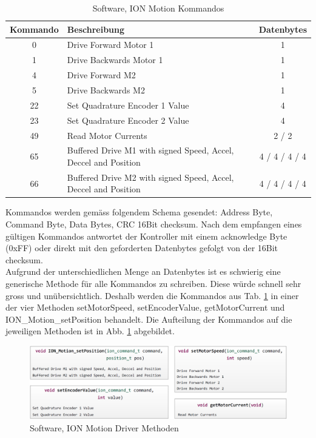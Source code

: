 \begin{table}[H]
	\footnotesize
	\centering
	\caption{Software, ION Motion Kommandos}
	\begin{tabular}{|c|l|c|}
		\hline
		\multicolumn{1}{|l|}{\textcolor[rgb]{ .247,  .247,  .247}{\textbf{Kommando}}} & \textcolor[rgb]{ .247,  .247,  .247}{\textbf{Beschreibung}} & \multicolumn{1}{l|}{\textcolor[rgb]{ .247,  .247,  .247}{\textbf{Datenbytes}}} \\
		\hline
		0     & Drive Forward Motor 1 & 1 \\
		\hline
		1     & Drive Backwards Motor 1 & 1 \\
		\hline
		4     & Drive Forward M2 & 1 \\
		\hline
		5     & Drive Backwards M2 & 1 \\
		\hline
		22    & Set Quadrature Encoder 1 Value & 4 \\
		\hline
		23    & Set Quadrature Encoder 2 Value & 4 \\
		\hline
		49    & Read Motor Currents & 2 / 2 \\
		\hline
		65    & Buffered Drive M1 with signed Speed, Accel, Deccel and Position & 4 / 4  / 4 / 4 \\
		\hline
		66    & Buffered Drive M2 with signed Speed, Accel, Deccel and Position & 4 / 4  / 4 / 4 \\
		\hline
	\end{tabular}%
	\label{tab:ION_Kommandos}%
\end{table}%

Kommandos werden gemäss folgendem Schema gesendet: Address Byte, Command Byte, Data Bytes, CRC 16Bit checksum.  Nach dem empfangen eines gültigen Kommandos antwortet der Kontroller mit einem acknowledge Byte (0xFF) oder direkt mit den geforderten Datenbytes gefolgt von der 16Bit checksum.\\ 
Aufgrund der unterschiedlichen Menge an Datenbytes ist es schwierig eine generische Methode für alle Kommandos zu schreiben. Diese würde schnell sehr gross und unübersichtlich. Deshalb werden die Kommandos aus Tab. \ref{tab:ION_Kommandos} in einer der vier Methoden setMotorSpeed, setEncoderValue, getMotorCurrent und ION\_Motion\_setPosition behandelt. Die Aufteilung der Kommandos auf die jeweiligen Methoden ist in Abb. \ref{fig:ION_Methoden} abgebildet.

\begin{figure}[H]
	\includegraphics[width=1\textwidth]{Illustrationen/6-Umsetzung/ION_Funktionen.png}
	\caption{Software, ION Motion Driver Methoden}
	\label{fig:ION_Methoden}
\end{figure}

